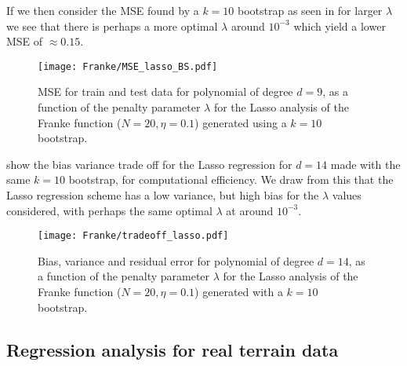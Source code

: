         If we then consider the MSE found by a $k=10$ bootstrap as seen in  for larger $\lambda$ we see that there is perhaps a more optimal $\lambda$ around $10^{-3}$ which yield a lower MSE of $\approx 0.15$. 

        \begin{figure}
            \texttt{[image: Franke/MSE\_lasso\_BS.pdf]}
            \caption{MSE for train and test data for polynomial of degree $d=9$, as a function of the penalty parameter $\lambda$ for the Lasso analysis of the Franke function ($N=20, \eta=0.1$) generated using a $k=10$ bootstrap. }
            \label{fig:bootstrapping_lasso}
        \end{figure}


         show the bias variance trade off for the Lasso regression for $d=14$ made with the same $k=10$ bootstrap, for computational efficiency. We draw from this that the Lasso regression scheme has a low variance, but high bias for the $\lambda$ values considered, with perhaps the same optimal $\lambda$ at around $10^{-3}$.


        \begin{figure}
            \texttt{[image: Franke/tradeoff\_lasso.pdf]}
            \caption{Bias, variance and residual error for polynomial of degree $d=14$, as a function of the penalty parameter $\lambda$ for the Lasso analysis of the Franke function ($N=20, \eta=0.1$) generated with a $k=10$ bootstrap.}
            \label{fig:bias_variance_lasso}
        \end{figure} 
        



        \clearpage

    \newpage

    \subsection{Regression analysis for real terrain data}\label{sec:reganalysis_real_data}

